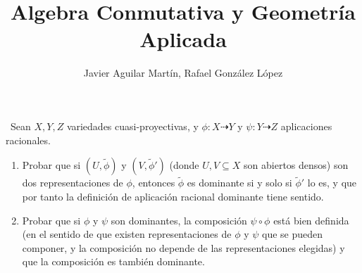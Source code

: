 \documentclass[twoside]{article}
\begin{document}
\title{Algebra Conmutativa y Geometría Aplicada}
\author{Javier Aguilar Martín, Rafael González López}
\maketitle

\begin{ejercicio}{1}\
Sean $X, Y,Z$ variedades cuasi-proyectivas, y $\phi : X \dashrightarrow Y$ y $\psi : Y \dashrightarrow Z$ aplicaciones racionales.
\begin{enumerate}
\item Probar que si $(U, \tilde{\phi})$ y $(V, \tilde{\phi}')$ (donde $U, V \subseteq X$ son abiertos densos) son
dos representaciones de $\phi$, entonces $\tilde{\phi}$ es dominante si y solo si $\tilde{\phi}'$ lo es, y
que por tanto la definición de aplicación racional dominante tiene sentido.
\item Probar que si $\phi$ y $\psi$ son dominantes, la composición  $\psi\circ\phi$ está bien definida
(en el sentido de que existen representaciones de $\phi$ y $\psi$ que se pueden
componer, y la composición no depende de las representaciones elegidas)
y que la composición es también dominante.
\end{enumerate}
\end{ejercicio}
\end{document}
